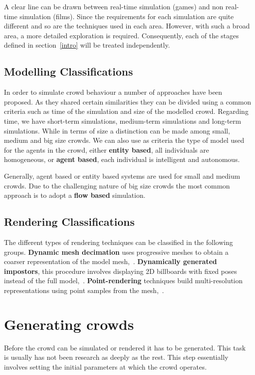 \documentclass[11pt]{article}
\begin{document}
\begin{multicols}{2}
A clear line can be drawn between real-time simulation (games) and non real-time simulation (films).
Since the requirements for each simulation are quite different and so are the techniques used in each area.
However, with such a broad area, a more detailed exploration is required.
Consequently, each of the stages defined in section~\ref{intro} will be treated independently.

\subsection{Modelling Classifications}

In order to simulate crowd behaviour a number of approaches have been proposed.
As they shared certain similarities they can be divided using a common criteria such as time of the simulation and size of the modelled crowd.
Regarding time, we have short-term simulations, medium-term simulations and long-term simulations.
While in terms of size a distinction can be made among small, medium and big size crowds.
We can also use as criteria the type of model used for the agents in the crowd, either \textbf{entity based}, all individuals are homogeneous, or \textbf{agent based}, each individual is intelligent and autonomous.

Generally, agent based or entity based systems are used for small and medium crowds.
Due to the challenging nature of big size crowds the most common approach is to adopt a \textbf{flow based} simulation.

\subsection{Rendering Classifications}

The different types of rendering techniques can be classified in the following groups.
\textbf{Dynamic mesh decimation} uses progressive meshes to obtain a coarser representation of the model mesh,~\cite{Hoppe1996}.
\textbf{Dynamically generated impostors}, this procedure involves displaying 2D billboards with fixed poses instead of the full model,~\cite{Aubel2000}.
\textbf{Point-rendering} techniques build multi-resolution representations using point samples from the mesh,~\cite{Wand2002}.

\section{Generating crowds}

Before the crowd can be simulated or rendered it has to be generated.
This task is usually has not been research as deeply as the rest.
This step essentially involves setting the initial parameters at which the crowd operates.


\end{multicols}
\end{document}
